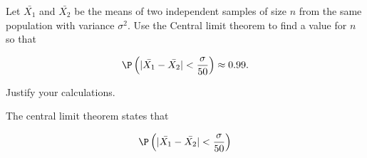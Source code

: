 
\begin{exercise}

Let $\bar{X_1}$ and $\bar{X_2}$ be the means of two independent samples of size $n$
from the same population with variance $\sigma^2$. Use the Central limit theorem to find
a value for $n$ so that

\begin{align*}
  \P\left(|\bar{X_1} - \bar{X_2}| < \frac{\sigma}{50}\right) \approx 0.99.
\end{align*}

Justify your calculations.

\end{exercise}


\begin{solution}

The central limit theorem states that

\begin{align*}
  \P\left(|\bar{X_1} - \bar{X_2}| < \frac{\sigma}{50}\right)
\end{align*}

\end{solution}

